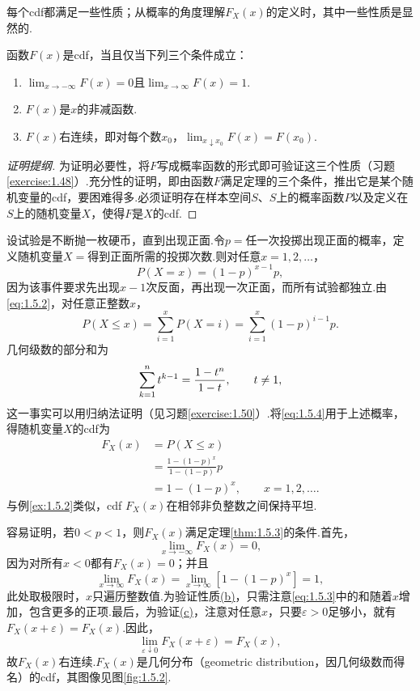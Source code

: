 每个cdf都满足一些性质；从概率的角度理解$F_X(x)$的定义时，其中一些性质是显然的.
\begin{theorem}\label{thm:1.5.3}
函数$F(x)$是cdf，当且仅当下列三个条件成立：
\begin{enumerate}[label=\alph*.]
\item\label{item:1.5.3a}$\lim_{x\to-\infty}F(x)=0$且$\lim_{x\to\infty}F(x)=1$.
\item\label{item:1.5.3b}$F(x)$是$x$的非减函数.
\item\label{item:1.5.3c}$F(x)$右连续，即对每个数$x_0$，$\lim_{x\downarrow x_0}F(x)=F(x_0)$.
\end{enumerate}
\end{theorem}
\begin{proof}[证明提纲]
为证明必要性，将$F$写成概率函数的形式即可验证这三个性质（习题\ref{exercise:1.48}）.充分性的证明，即由函数$F$满足定理的三个条件，推出它是某个随机变量的cdf，要困难得多.必须证明存在样本空间$S$、$S$上的概率函数$P$以及定义在$S$上的随机变量$X$，使得$F$是$X$的cdf.
\end{proof}

\begin{example}[抛掷直到出现正面]\label{ex:1.5.4}
设试验是不断抛一枚硬币，直到出现正面.令$p=\text{任一次投掷出现正面的概率}$，定义随机变量$X=\text{得到正面所需的投掷次数}$.则对任意$x=1,2,\ldots$，
\begin{equation}\label{eq:1.5.2}P(X=x)=(1-p)^{x-1}p,\end{equation}
因为该事件要求先出现$x-1$次反面，再出现一次正面，而所有试验都独立.由\eqref{eq:1.5.2}，对任意正整数$x$，
\begin{equation}\label{eq:1.5.3}P(X\le x)=\sum_{i=1}^xP(X=i)=\sum_{i=1}^x(1-p)^{i-1}p.\end{equation}
几何级数的部分和为
\begin{equation}\label{eq:1.5.4}\index{SI0460@部分和}\sum_{k=1}^nt^{k-1}=\frac{1-t^n}{1-t},\qquad t\ne1,\end{equation}
这一事实可以用归纳法证明（见习题\ref{exercise:1.50}）.将\eqref{eq:1.5.4}用于上述概率，得随机变量$X$的cdf为
\begin{equation*}\begin{aligned}
F_X(x)&=P(X\le x)\\
&=\frac{1-(1-p)^x}{1-(1-p)}p\\
&=1-(1-p)^x,\qquad x=1,2,\ldots.
\end{aligned}\end{equation*}
与例\ref{ex:1.5.2}类似，cdf $F_X(x)$在相邻非负整数之间保持平坦.

容易证明，若$0<p<1$，则$F_X(x)$满足定理\ref{thm:1.5.3}的条件.首先，
$$\lim_{x\to-\infty}F_X(x)=0,$$
因为对所有$x<0$都有$F_X(x)=0$；并且
$$\lim_{x\to\infty}F_X(x)=\lim_{x\to\infty}[1-(1-p)^x]=1,$$
此处取极限时，$x$只遍历整数值.为验证性质\hyperref[item:1.5.3b]{(b)}，只需注意\eqref{eq:1.5.3}中的和随着$x$增加，包含更多的正项.最后，为验证\hyperref[item:1.5.3c]{(c)}，注意对任意$x$，只要$\varepsilon>0$足够小，就有$F_X(x+\varepsilon)=F_X(x)$.因此，
$$\lim_{\varepsilon\downarrow0}F_X(x+\varepsilon)=F_X(x),$$
故$F_X(x)$右连续.$F_X(x)$是几何分布（geometric distribution，因几何级数而得名）的cdf，其图像见图\ref{fig:1.5.2}.
\end{example}


